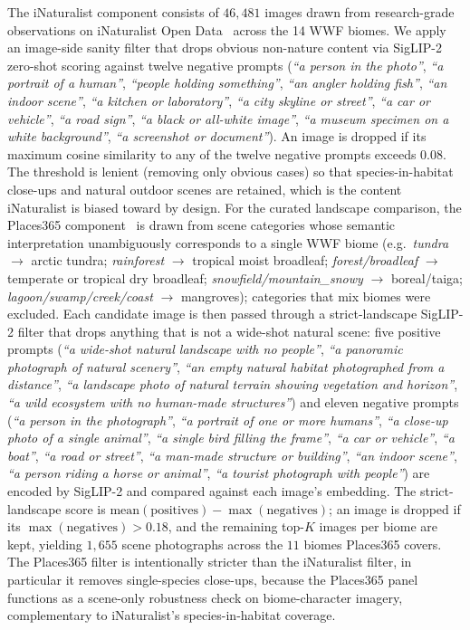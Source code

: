 \documentclass[11pt,a4paper]{article}
\begin{document}
The iNaturalist component consists of $46{,}481$ images drawn from
research-grade observations on iNaturalist Open
Data~\citep{inaturalist2024} across the 14 WWF biomes. We apply an
image-side sanity filter that drops obvious non-nature content via
SigLIP-2 zero-shot scoring against twelve negative prompts
(\emph{``a person in the photo''}, \emph{``a portrait of a human''},
\emph{``people holding something''}, \emph{``an angler holding
fish''}, \emph{``an indoor scene''}, \emph{``a kitchen or
laboratory''}, \emph{``a city skyline or street''}, \emph{``a car
or vehicle''}, \emph{``a road sign''}, \emph{``a black or
all-white image''}, \emph{``a museum specimen on a white
background''}, \emph{``a screenshot or document''}). An image is
dropped if its maximum cosine similarity to any of the twelve
negative prompts exceeds $0.08$. The threshold is lenient
(removing only obvious cases) so that species-in-habitat
close-ups and natural outdoor scenes are retained, which is the
content iNaturalist is biased toward by design. For the curated landscape comparison, the Places365
component~\citep{zhou2018places} is drawn from scene categories
whose semantic interpretation unambiguously corresponds to a
single WWF biome (e.g.\ \emph{tundra} $\to$ arctic tundra;
\emph{rainforest} $\to$ tropical moist broadleaf;
\emph{forest/broadleaf} $\to$ temperate or tropical dry
broadleaf; \emph{snowfield/mountain\_snowy} $\to$ boreal/taiga;
\emph{lagoon/swamp/creek/coast} $\to$ mangroves); categories that
mix biomes were excluded. Each candidate image is then passed
through a strict-landscape SigLIP-2 filter that drops anything
that is not a wide-shot natural scene: five positive prompts
(\emph{``a wide-shot natural landscape with no people''},
\emph{``a panoramic photograph of natural scenery''}, \emph{``an
empty natural habitat photographed from a distance''}, \emph{``a
landscape photo of natural terrain showing vegetation and
horizon''}, \emph{``a wild ecosystem with no human-made
structures''}) and eleven negative prompts (\emph{``a person in
the photograph''}, \emph{``a portrait of one or more humans''},
\emph{``a close-up photo of a single animal''}, \emph{``a single
bird filling the frame''}, \emph{``a car or vehicle''}, \emph{``a
boat''}, \emph{``a road or street''}, \emph{``a man-made structure
or building''}, \emph{``an indoor scene''}, \emph{``a person
riding a horse or animal''}, \emph{``a tourist photograph with
people''}) are encoded by SigLIP-2 and compared against each
image's embedding. The strict-landscape score is
$\mathrm{mean}(\text{positives}) - \max(\text{negatives})$; an
image is dropped if its $\max(\text{negatives}) > 0.18$, and the
remaining top-$K$ images per biome are kept, yielding $1{,}655$ scene
photographs across the $11$ biomes Places365 covers. The Places365 filter
is intentionally stricter than the iNaturalist filter, in
particular it removes single-species close-ups, because the
Places365 panel functions as a scene-only robustness check on
biome-character imagery, complementary to iNaturalist's
species-in-habitat coverage.
\end{document}
